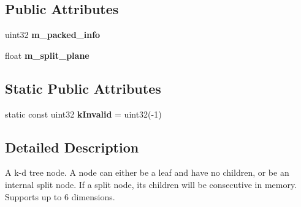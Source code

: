 \subsection*{\-Public \-Attributes}
\begin{DoxyCompactItemize}
\item 
\hypertarget{structnih_1_1_kd__node_ae0a6a4ce3de8a3dc5c4fbeb6f03a9414}{
uint32 {\bfseries m\-\_\-packed\-\_\-info}}
\label{structnih_1_1_kd__node_ae0a6a4ce3de8a3dc5c4fbeb6f03a9414}

\item 
\hypertarget{structnih_1_1_kd__node_ae2e1ffe17f5358536a749ab65b3238fc}{
float {\bfseries m\-\_\-split\-\_\-plane}}
\label{structnih_1_1_kd__node_ae2e1ffe17f5358536a749ab65b3238fc}

\end{DoxyCompactItemize}
\subsection*{\-Static \-Public \-Attributes}
\begin{DoxyCompactItemize}
\item 
\hypertarget{structnih_1_1_kd__node_af76cdc6cf213309f00fa480b4192af08}{
static const uint32 {\bfseries k\-Invalid} = uint32(-\/1)}
\label{structnih_1_1_kd__node_af76cdc6cf213309f00fa480b4192af08}

\end{DoxyCompactItemize}


\subsection{\-Detailed \-Description}
\-A k-\/d tree node. \-A node can either be a leaf and have no children, or be an internal split node. \-If a split node, its children will be consecutive in memory. \-Supports up to 6 dimensions. 

